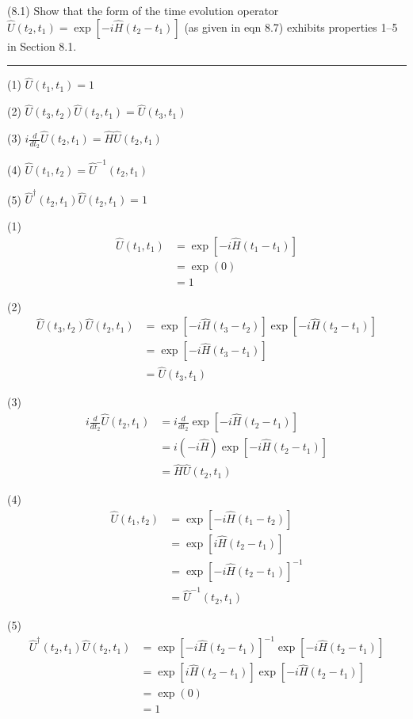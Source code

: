 \documentclass[12pt]{article}
\begin{document}
(8.1)
Show that the form of the time evolution operator
$\hat U(t_2,t_1)=\exp[-i\hat H(t_2-t_1)]$ (as given in eqn 8.7)
exhibits properties 1--5 in Section 8.1.

\bigskip
\hrule

\bigskip
(1) $\hat U(t_1,t_1)=1$

(2) $\hat U(t_3,t_2)\hat U(t_2,t_1)=\hat U(t_3,t_1)$

(3) $i\frac{d}{dt_2}\hat U(t_2,t_1)=\hat H\hat U(t_2,t_1)$

(4) $\hat U(t_1,t_2)=\hat U^{-1}(t_2,t_1)$

(5) $\hat U^\dag(t_2,t_1)\hat U(t_2,t_1)=1$

\bigskip
(1)
\begin{align*}
\hat U(t_1,t_1)
&=\exp[-i\hat H(t_1-t_1)]
\\
&=\exp(0)
\\
&=1
\end{align*}

(2)
\begin{align*}
\hat U(t_3,t_2)\hat U(t_2,t_1)
&=\exp[-i\hat H(t_3-t_2)]\exp[-i\hat H(t_2-t_1)]
\\
&=\exp[-i\hat H(t_3-t_1)]
\\
&=\hat U(t_3,t_1)
\end{align*}

(3)
\begin{align*}
i\frac{d}{dt_2}\hat U(t_2,t_1)
&=i\frac{d}{dt_2}\exp[-i\hat H(t_2-t_1)]
\\
&=i(-i\hat H)\exp[-i\hat H(t_2-t_1)]
\\
&=\hat H\hat U(t_2,t_1)
\end{align*}

(4)
\begin{align*}
\hat U(t_1,t_2)
&=\exp[-i\hat H(t_1-t_2)]
\\
&=\exp[i\hat H(t_2-t_1)]
\\
&=\exp[-i\hat H(t_2-t_1)]^{-1}
\\
&=\hat U^{-1}(t_2,t_1)
\end{align*}

(5)
\begin{align*}
\hat U^\dag(t_2,t_1)\hat U(t_2,t_1)
&=\exp[-i\hat H(t_2-t_1)]^{-1}\exp[-i\hat H(t_2-t_1)]
\\
&=\exp[i\hat H(t_2-t_1)]\exp[-i\hat H(t_2-t_1)]
\\
&=\exp(0)
\\
&=1
\end{align*}
\end{document}
